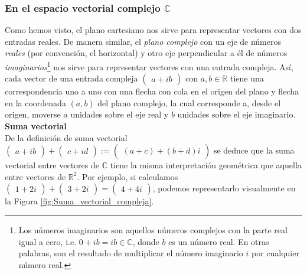 \documentclass[notasLineal]{subfiles}
\begin{document}
\subsubsection*{En el espacio vectorial complejo \texorpdfstring{$\mathbb{C}$}{TEXT}}

Como hemos visto, el plano cartesiano nos sirve para representar vectores con dos entradas reales. De manera similar, el \emph{plano complejo} \textemdash con un eje de números \emph{reales} (por convención, el horizontal) y otro eje perpendicular a él de números \emph{imaginarios}\footnote{Los números imaginarios son aquellos números complejos con la parte real igual a cero, i.e. $0+ib=ib\in\mathbb{C}$, donde $b$ es un número real. En otras palabras, son el resultado de multiplicar el número imaginario $i$ por cualquier número real.}\textemdash\hspace{0.5mm} nos sirve para representar vectores con una entrada compleja. Así, cada vector de una entrada compleja $\begin{pmatrix}a+ib\end{pmatrix}$ con $a,b\in\mathbb{R}$ tiene una correspondencia uno a uno con una flecha con cola en el origen del plano y flecha en la coordenada $(a,b)$ del plano complejo, la cual corresponde a, desde el origen, moverse $a$ unidades sobre el eje real y $b$ unidades sobre el eje imaginario. \\

\textbf{Suma vectorial} \\

De la definición de suma vectorial $\begin{pmatrix}a+ib\end{pmatrix}+\begin{pmatrix}c+id\end{pmatrix}:=\begin{pmatrix}(a+c)+(b+d)i\end{pmatrix}$ se deduce que la suma vectorial entre vectores de $\mathbb{C}$ tiene la misma interpretación geométrica que aquella entre vectores de $\mathbb{R}^2$. Por ejemplo, si calculamos $\begin{pmatrix}1+2i\end{pmatrix}+\begin{pmatrix}3+2i\end{pmatrix}=\begin{pmatrix}4+4i\end{pmatrix}$, podemos representarlo visualmente en la Figura \ref{fig:Suma_vectorial_compleja}. \\
\end{document}
